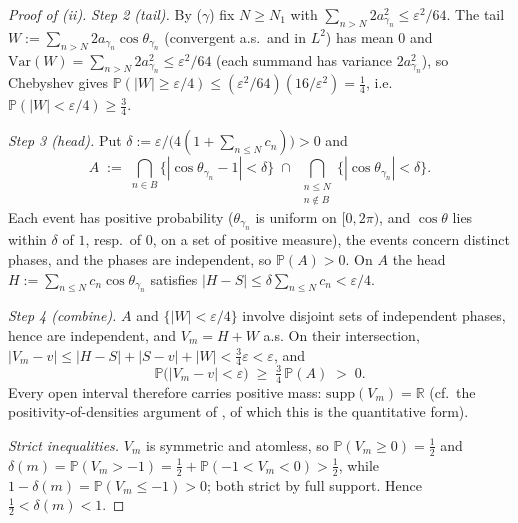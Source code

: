 \documentclass[11pt]{article}
\begin{document}
\begin{proof}[Proof of (ii)]
\emph{Step 2 (tail).} By ($\gamma$) fix $N\ge N_1$ with
$\sum_{n>N}2a_{\gamma_n}^2\le\varepsilon^2/64$. The tail
$W:=\sum_{n>N}2a_{\gamma_n}\cos\theta_{\gamma_n}$ (convergent a.s.\ and
in $L^2$) has mean $0$ and
$\mathrm{Var}(W)=\sum_{n>N}2a_{\gamma_n}^2\le\varepsilon^2/64$
(each summand has variance $2a_{\gamma_n}^2$), so Chebyshev gives
$\mathbb P(|W|\ge\varepsilon/4)\le(\varepsilon^2/64)(16/\varepsilon^2)
=\tfrac14$, i.e.\ $\mathbb P(|W|<\varepsilon/4)\ge\tfrac34$.

\emph{Step 3 (head).} Put
$\delta:=\varepsilon/\bigl(4(1+\sum_{n\le N}c_n)\bigr)>0$ and
\[
A\;:=\;\bigcap_{n\in B}\bigl\{|\cos\theta_{\gamma_n}-1|<\delta\bigr\}
\;\cap\;\bigcap_{\substack{n\le N\\ n\notin B}}
\bigl\{|\cos\theta_{\gamma_n}|<\delta\bigr\}.
\]
Each event has positive probability ($\theta_{\gamma_n}$ is uniform on
$[0,2\pi)$, and $\cos\theta$ lies within $\delta$ of $1$, resp.\ of
$0$, on a set of positive measure), the events concern distinct
phases, and the phases are independent, so $\mathbb P(A)>0$. On $A$
the head $H:=\sum_{n\le N}c_n\cos\theta_{\gamma_n}$ satisfies
$|H-S|\le\delta\sum_{n\le N}c_n<\varepsilon/4$.

\emph{Step 4 (combine).} $A$ and $\{|W|<\varepsilon/4\}$ involve
disjoint sets of independent phases, hence are independent, and
$V_m=H+W$ a.s. On their intersection,
$|V_m-v|\le|H-S|+|S-v|+|W|<\tfrac34\varepsilon<\varepsilon$, and
\[
\mathbb P\bigl(|V_m-v|<\varepsilon\bigr)
\;\ge\;\tfrac34\,\mathbb P(A)\;>\;0 .
\]
Every open interval therefore carries positive mass:
$\mathrm{supp}(V_m)=\mathbb R$ (cf.\ the positivity-of-densities
argument of \cite{RS94}, of which this is the quantitative form).

\emph{Strict inequalities.} $V_m$ is symmetric and atomless, so
$\mathbb P(V_m\ge0)=\tfrac12$ and
$\delta(m)=\mathbb P(V_m>-1)=\tfrac12+\mathbb P(-1<V_m<0)>\tfrac12$,
while $1-\delta(m)=\mathbb P(V_m\le-1)>0$; both strict by full
support. Hence $\tfrac12<\delta(m)<1$.


\end{proof}
\end{document}
